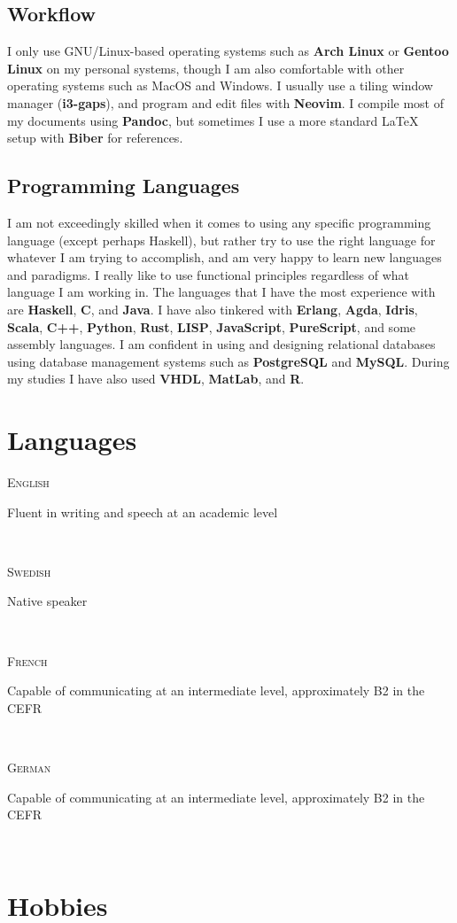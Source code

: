 \documentclass[letterpaper,
		10pt]{article}
\newcommand{\entry}[4]{
\ifthenelse{\isempty{#3}}
{\slimentry{#1}{#2}}{

\begin{minipage}[t]{.15\linewidth}
\hfill \textsc{#1}
\end{minipage}
\hfill\vline\hfill
\begin{minipage}[t]{.80\linewidth}
{\bf#2}\\\textit{#3} \small{#4}
\end{minipage}\\
\vspace{.2cm}
}}
\newcommand{\slimentry}[2]{
\begin{minipage}[t]{.15\linewidth}
\hfill \textsc{#1}
\end{minipage}
\hfill\vline\hfill
\begin{minipage}[t]{.80\linewidth}
#2
\end{minipage}\\
\vspace{.25cm}
}
\newcommand{\sentry}[2]{
\begin{minipage}[t]{.15\linewidth}
\hfill \textsc{#1}
\end{minipage}
\hfill\vline\hfill
\begin{minipage}[t]{.80\linewidth}
#2
\end{minipage}\\
\vspace{-.15cm}
}%
\begin{document}
\subsection{Workflow}

I only use GNU/Linux-based operating systems such as \textbf{Arch Linux} or \textbf{Gentoo Linux} on my personal systems,
though I am also comfortable with other operating systems such as MacOS and Windows.
I usually use a tiling window manager (\textbf{i3-gaps}), and program and edit files with \textbf{Neovim}.
I compile most of my documents using \textbf{Pandoc}, but sometimes I use a more standard \LaTeX \, setup with \textbf{Biber}
for references.

\subsection{Programming Languages}

I am not exceedingly skilled when it comes to using any specific programming language (except perhaps Haskell), but
rather try to use the right language for whatever I am trying to accomplish, and am very happy
to learn new languages and paradigms. I really like to use functional principles regardless of what
language I am working in. The languages that I have
the most experience with are \textbf{Haskell}, \textbf{C}, and \textbf{Java}. I have also tinkered
with \textbf{Erlang}, \textbf{Agda}, \textbf{Idris}, \textbf{Scala}, \textbf{C++},
\textbf{Python}, \textbf{Rust}, \textbf{LISP}, \textbf{JavaScript}, \textbf{PureScript}, and some assembly languages. I am
confident in using and designing relational databases using database management systems such as
\textbf{PostgreSQL} and \textbf{MySQL}. During my studies I have also used
\textbf{VHDL}, \textbf{MatLab}, and \textbf{R}.

\section{Languages}

\sentry{English}{Fluent in writing and speech at an academic level}

\sentry{Swedish}{Native speaker}

\sentry{French}{Capable of communicating at an intermediate level, approximately B2 in the CEFR}

\sentry{German}{Capable of communicating at an intermediate level, approximately B2 in the CEFR}

\section{Hobbies}
\end{document}
